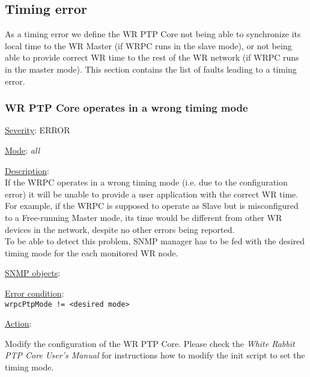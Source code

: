 \newpage
\subsection{Timing error}
\label{sec:timing_fail}
As a timing error we define the WR PTP Core not being able to synchronize its
local time to the WR Master (if WRPC runs in the slave mode), or not being able
to provide correct WR time to the rest of the WR network (if WRPC runs in the
master mode). This section contains the list of faults leading to a timing error.

\subsubsection{\bf WR PTP Core operates in a wrong timing mode}
    \label{fail:timing:ppsi_wrong_mode}
    \begin{pck_descr}
			\item [] \underline{Severity}: ERROR
			\item [] \underline{Mode}: \emph{all}
			\item [] \underline{Description}:\\
        If the WRPC operates in a wrong timing mode (i.e. due to the
        configuration error) it will be unable to provide a user application
        with the correct WR time. For example, if the WRPC is supposed to
        operate as Slave but is misconfigured to a Free-running Master mode, its
        time would be different from other WR devices in the network, despite no
        other errors being reported.\\
        To be able to detect this problem, SNMP manager has to be fed with the
        desired timing mode for the each monitored WR node.
			\item [] \underline{SNMP objects}:\\
        {\footnotesize
         }
			\item [] \underline{Error condition}:\\
        {\footnotesize
        \texttt{wrpcPtpMode != <desired mode>}}
      \item [] \underline{Action}:
        \begin{pck_proc}
        \item Modify the configuration of the WR PTP Core. Please check the
          \emph{White Rabbit PTP Core User's Manual} for instructions how to
          modify the init script to set the timing mode.
        \end{pck_proc}
    \end{pck_descr}

